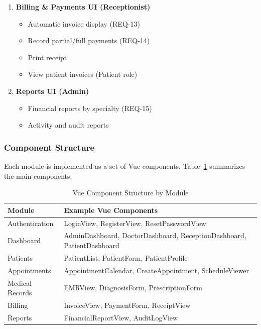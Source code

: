\begin{enumerate}
	\begin{itemize}
		\item View complete EMR (REQ-5)
		\item Record diagnosis and clinical notes (REQ-10)
		\item Generate electronic prescription (REQ-11)
		\item Link services to diagnosis (REQ-12)
	\end{itemize}
	\item \textbf{Billing \& Payments UI (Receptionist)}
	\begin{itemize}
		\item Automatic invoice display (REQ-13)
		\item Record partial/full payments (REQ-14)
		\item Print receipt
		\item View patient invoices (Patient role)
	\end{itemize}
	\item \textbf{Reports UI (Admin)}
	\begin{itemize}
		\item Financial reports by specialty (REQ-15)
		\item Activity and audit reports
	\end{itemize}
\end{enumerate}
\subsubsection{Component Structure}
Each module is implemented as a set of Vue components. Table~\ref{tab:component-structure} summarizes the main components.
\begin{table}[H]
	\centering
	\caption{Vue Component Structure by Module}
	\label{tab:component-structure}
	\begin{tabularx}{\textwidth}{l X}
		\toprule
		\textbf{Module} & \textbf{Example Vue Components} \\
		\midrule
		Authentication & LoginView, RegisterView, ResetPasswordView \\[6pt]
		Dashboard & AdminDashboard, DoctorDashboard, ReceptionDashboard, PatientDashboard \\[6pt]
		Patients & PatientList, PatientForm, PatientProfile \\[6pt]
		Appointments & AppointmentCalendar, CreateAppointment, ScheduleViewer \\[6pt]
		Medical Records & EMRView, DiagnosisForm, PrescriptionForm \\[6pt]
		Billing & InvoiceView, PaymentForm, ReceiptView \\[6pt]
		Reports & FinancialReportView, AuditLogView \\
		\bottomrule
	\end{tabularx}
\end{table}
